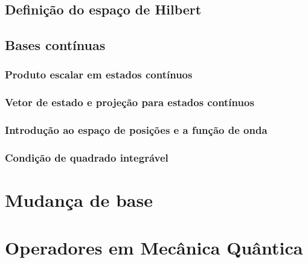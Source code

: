 \documentclass{header}
\begin{document}
            \subsection{Definição do espaço de Hilbert}
                

            \subsection{Bases contínuas}
                

                \subsubsection{Produto escalar em estados contínuos}
                    

                \subsubsection{Vetor de estado e projeção para estados contínuos}
                    

                \subsubsection{Introdução ao espaço de posições e a função de onda}
                    

                \subsubsection{Condição de quadrado integrável}
                    

        \section{Mudança de base}
            

        \section{Operadores em Mecânica Quântica}
            
\end{document}
